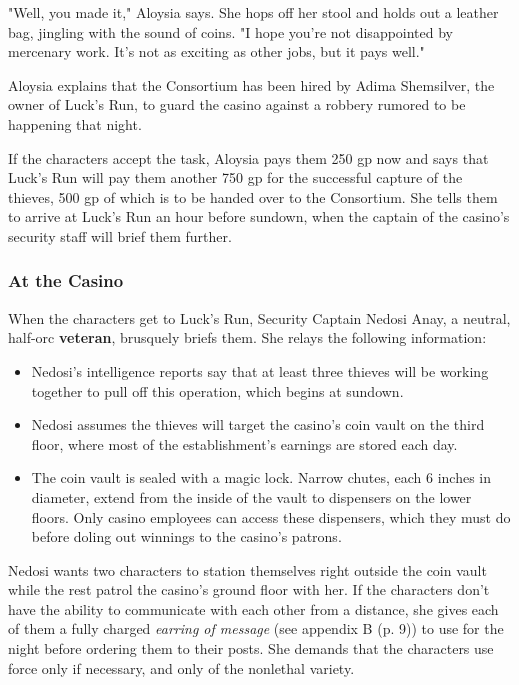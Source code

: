 \documentclass[letterpaper, 11pt, bg=full, twocolumn]{dndbook}
\begin{document}
\begin{DndReadAloud}
"Well, you made it," Aloysia says. She hops off her stool and holds out a leather bag, jingling with the sound of coins. "I hope you're not disappointed by mercenary work. It's not as exciting as other jobs, but it pays well."
\end{DndReadAloud}

Aloysia explains that the Consortium has been hired by Adima Shemsilver, the owner of Luck's Run, to guard the casino against a robbery rumored to be happening that night.

If the characters accept the task, Aloysia pays them 250 gp now and says that Luck's Run will pay them another 750 gp for the successful capture of the thieves, 500 gp of which is to be handed over to the Consortium. She tells them to arrive at Luck's Run an hour before sundown, when the captain of the casino's security staff will brief them further.

\subsubsection{At the Casino}

When the characters get to Luck's Run, Security Captain Nedosi Anay, a neutral, half-orc \textbf{veteran}, brusquely briefs them. She relays the following information:

\begin{itemize}
\item Nedosi's intelligence reports say that at least three thieves will be working together to pull off this operation, which begins at sundown.
\item Nedosi assumes the thieves will target the casino's coin vault on the third floor, where most of the establishment's earnings are stored each day.
\item The coin vault is sealed with a magic lock. Narrow chutes, each 6 inches in diameter, extend from the inside of the vault to dispensers on the lower floors. Only casino employees can access these dispensers, which they must do before doling out winnings to the casino's patrons.
\end{itemize}

Nedosi wants two characters to station themselves right outside the coin vault while the rest patrol the casino's ground floor with her. If the characters don't have the ability to communicate with each other from a distance, she gives each of them a fully charged \textit{earring of message} (see appendix B (p. 9)) to use for the night before ordering them to their posts. She demands that the characters use force only if necessary, and only of the nonlethal variety.
\end{document}
